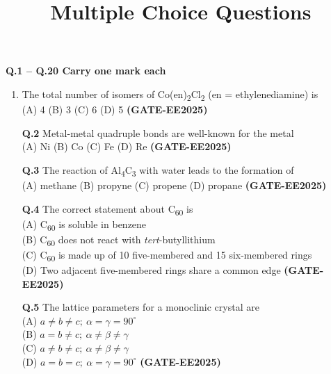 \documentclass[12pt]{article}
\title{Multiple Choice Questions}
\date{}
\begin{document}
\maketitle

\textbf{Q.1 -- Q.20 Carry one mark each}

\begin{enumerate}

   \item   The total number of isomers of Co(en)\textsubscript{2}Cl\textsubscript{2} (en = ethylenediamine) is\\
    (A) 4 \quad (B) 3 \quad (C) 6 \quad (D) 5                         
      \textbf{(GATE-EE2025)}

    \vspace{0.5cm}

   \textbf{Q.2}  Metal-metal quadruple bonds are well-known for the metal\\
    (A) Ni \quad (B) Co \quad (C) Fe \quad (D) Re   
  \textbf{(GATE-EE2025)}
    
    \vspace{0.5cm}

    \textbf{Q.3} The reaction of Al\textsubscript{4}C\textsubscript{3} with water leads to the formation of\\
    (A) methane \quad (B) propyne \quad (C) propene \quad (D) propane  
  \textbf{(GATE-EE2025)}

    \vspace{0.5cm}

   \textbf{Q.4}  The correct statement about C\textsubscript{60} is\\
    (A) C\textsubscript{60} is soluble in benzene\\
    (B) C\textsubscript{60} does not react with \textit{tert}-butyllithium\\
    (C) C\textsubscript{60} is made up of 10 five-membered and 15 six-membered rings\\
    (D) Two adjacent five-membered rings share a common edge   \textbf{(GATE-EE2025)}

    \vspace{0.5cm}

   \textbf{Q.5} The lattice parameters for a monoclinic crystal are\\
    (A) $a \neq b \neq c; \ \alpha = \gamma = 90^\circ$\\
    (B) $a = b \neq c; \ \alpha \neq \beta \neq \gamma$\\
    (C) $a \neq b \neq c; \ \alpha \neq \beta \neq \gamma$\\
    (D) $a = b = c; \ \alpha = \gamma = 90^\circ$   \textbf{(GATE-EE2025)}



\end{enumerate}
\end{document}
